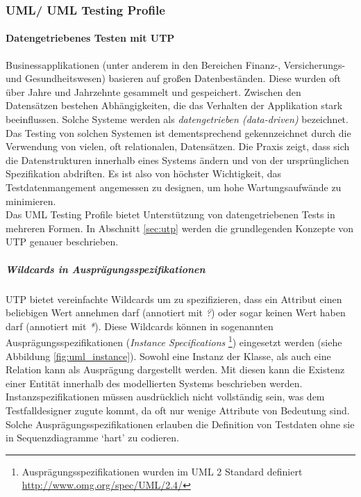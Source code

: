 \subsubsection{UML/ UML Testing Profile}
\paragraph{Datengetriebenes Testen mit UTP} 
Businessapplikationen (unter anderem in den Bereichen Finanz-, Versicherungs- und Gesundheitswesen) basieren auf großen Datenbeständen. Diese wurden oft über Jahre und Jahrzehnte gesammelt und gespeichert. Zwischen den Datensätzen bestehen Abhängigkeiten, die das Verhalten der Applikation stark beeinflussen. Solche Systeme werden als \textit{datengetrieben (data-driven)} bezeichnet. Das Testing von solchen Systemen ist dementsprechend gekennzeichnet durch die Verwendung von vielen, oft relationalen, Datensätzen. Die Praxis zeigt, dass sich die Datenstrukturen innerhalb eines Systems ändern und von der ursprünglichen Spezifikation abdriften. Es ist also von höchster Wichtigkeit, das Testdatenmangement angemessen zu designen, um hohe Wartungsaufwände zu minimieren. \cite{baker_model-driven_2005}\\
Das UML Testing Profile bietet Unterstützung von datengetriebenen Tests in mehreren Formen. In Abschnitt \ref{sec:utp} werden die grundlegenden Konzepte von \Gls{UTP} genauer beschrieben.

\subparagraph{Wildcards in Ausprägungsspezifikationen}
\Gls{UTP} bietet vereinfachte Wildcards um zu spezifizieren, dass ein Attribut einen beliebigen Wert annehmen darf (annotiert mit \textit{?}) oder sogar keinen Wert haben darf (annotiert mit \textit{*}). Diese Wildcards können in sogenannten Ausprägungsspezifikationen (\textit{Instance Specifications} \footnote{Ausprägungsspezifikationen wurden im UML 2 Standard definiert \url{http://www.omg.org/spec/UML/2.4/} }) eingesetzt werden (siehe Abbildung \ref{fig:uml_instance}). Sowohl eine Instanz der Klasse, als auch eine Relation kann als Ausprägung dargestellt werden. Mit diesen kann die Existenz einer Entität innerhalb des modellierten Systems beschrieben werden. Instanzspezifikationen müssen ausdrücklich nicht vollständig sein, was dem  Testfalldesigner zugute kommt, da oft nur wenige Attribute von Bedeutung sind. Solche Ausprägungsspezifikationen erlauben die Definition von Testdaten ohne sie in Sequenzdiagramme `hart' zu codieren.
 
